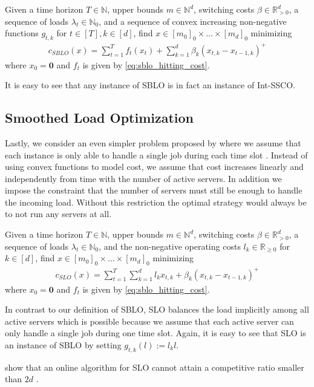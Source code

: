 \begin{problem}\label{problem:sblo}
Given a time horizon $T \in \mathbb{N}$, upper bounds $m \in \mathbb{N}^d$, switching costs $\beta \in \mathbb{R}_{>0}^d$, a sequence of loads $\lambda_t \in \mathbb{N}_0$, and a sequence of convex increasing non-negative functions $g_{t,k}$ for $t \in [T], k \in [d]$, find $x \in [m_0]_0 \times \dots \times [m_d]_0$ minimizing \begin{align*}
    c_{SBLO}(x) = \sum_{t=1}^T f_t(x_t) + \sum_{k=1}^d \beta_k (x_{t,k} - x_{t-1,k})^+
\end{align*}
where $x_0 = \mathbf{0}$ and $f_t$ is given by \autoref{eq:sblo_hitting_cost}.
\end{problem}

It is easy to see that any instance of SBLO is in fact an instance of Int-SSCO.

\subsection{Smoothed Load Optimization}

Lastly, we consider an even simpler problem proposed by \citeauthor*{Albers2021} where we assume that each instance is only able to handle a single job during each time slot \cite{Albers2021}. Instead of using convex functions to model cost, we assume that cost increases linearly and independently from time with the number of active servers. In addition we impose the constraint that the number of servers must still be enough to handle the incoming load. Without this restriction the optimal strategy would always be to not run any servers at all.

\begin{problem}\label{problem:sblo}
Given a time horizon $T \in \mathbb{N}$, upper bounds $m \in \mathbb{N}^d$, switching costs $\beta \in \mathbb{R}_{>0}^d$, a sequence of loads $\lambda_t \in \mathbb{N}_0$, and the non-negative operating costs $l_k \in \mathbb{R}_{\geq 0}$ for $k \in [d]$, find $x \in [m_0]_0 \times \dots \times [m_d]_0$ minimizing \begin{align*}
    c_{SLO}(x) = \sum_{t=1}^T \sum_{k=1}^d l_k x_{t,k} + \beta_k (x_{t,k} - x_{t-1,k})^+
\end{align*}
where $x_0 = \mathbf{0}$ and $f_t$ is given by \autoref{eq:sblo_hitting_cost}.
\end{problem}

In contrast to our definition of SBLO, SLO balances the load implicitly among all active servers which is possible because we assume that each active server can only handle a single job during one time slot. Again, it is easy to see that SLO is an instance of SBLO by setting $g_{t,k}(l) := l_k l$.

\citeauthor*{Albers2021} show that an online algorithm for SLO cannot attain a competitive ratio smaller than $2d$ \cite{Albers2021}.
